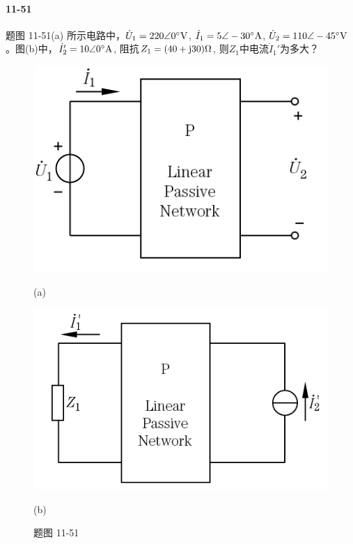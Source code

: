 \documentclass[hyperref, UTF8]{ctexart}
\newcommand{\volt}{{\rm V}}
\newcommand{\ampere}{{\rm A}}
\newcommand{\ohm}{\Omega}
\newcommand{\degree}{^{\circ}}
\newcommand{\J}{{\rm j}}
\begin{document}
\paragraph{11-51}\label{11-51}
题图 11-51(a) 所示电路中，$\dot{U}_1=220 \angle 0 \degree \volt$, $\dot{I}_1 = 5 \angle -30 \degree \ampere$, $\dot{U}_2 = 110 \angle -45 \degree \volt$。图(b)中，$\dot{I}_2'=10\angle 0\degree \ampere$, 阻抗$Z_1=(40+\J 30)\ohm$, 则$Z_1$中电流$\dot{I}_1'$为多大？

\begin{figure}[!htb]
\centering
\begin{minipage}[t]{0.291\textwidth}
\centering
\includegraphics[width=1\textwidth]{p11-51-a.png}
\caption*{(a)}
\end{minipage}
\begin{minipage}[t]{0.327\textwidth}
\centering
\includegraphics[width=1\textwidth]{p11-51-b.png}
\caption*{(b)}
\end{minipage}
\caption*{题图 11-51}
\end{figure}
\end{document}
